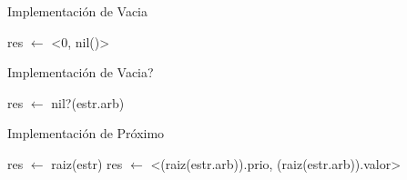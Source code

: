 \begin{Algoritmos}

\begin{algorithm}
\caption{Implementaci\'on de Vacia}
\begin{algorithmic}[0]
\State res $\gets$ <0, nil()> 
\EndFunction
\end{algorithmic}
\end{algorithm}


\begin{algorithm}
\caption{Implementaci\'on de Vacia?}
\begin{algorithmic}[0]
\State res $\gets$ nil?(estr.arb) 
\EndFunction
\end{algorithmic}
\end{algorithm}

\begin{algorithm}
\caption{Implementaci\'on de Pr\'oximo}
\begin{algorithmic}[0]
\State res $\gets$ raiz(estr) 
\State res $\gets$ <(raiz(estr.arb)).prio, (raiz(estr.arb)).valor> 
\EndFunction
\end{algorithmic}
\end{algorithm}




\end{Algoritmos}
